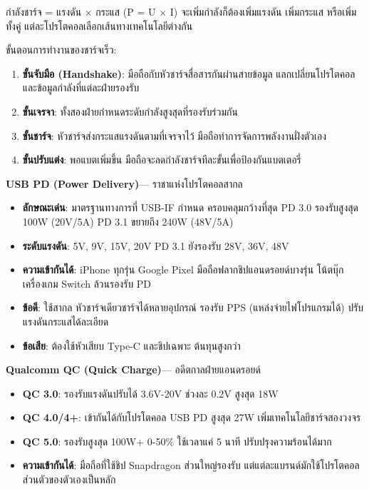 
กำลังชาร์จ = แรงดัน × กระแส (P = U × I) จะเพิ่มกำลังก็ต้องเพิ่มแรงดัน เพิ่มกระแส หรือเพิ่มทั้งคู่ แต่ละโปรโตคอลเลือกเส้นทางเทคโนโลยีต่างกัน

ขั้นตอนการทำงานของชาร์จเร็ว:

\begin{enumerate}
  \item \textbf{ขั้นจับมือ (Handshake)}: มือถือกับหัวชาร์จสื่อสารกันผ่านสายข้อมูล แลกเปลี่ยนโปรโตคอลและข้อมูลกำลังที่แต่ละฝ่ายรองรับ
  \item \textbf{ขั้นเจรจา}: ทั้งสองฝ่ายกำหนดระดับกำลังสูงสุดที่รองรับร่วมกัน
  \item \textbf{ขั้นชาร์จ}: หัวชาร์จส่งกระแสแรงดันตามที่เจรจาไว้ มือถือทำการจัดการพลังงานฝั่งตัวเอง
  \item \textbf{ขั้นปรับแต่ง}: พอแบตเพิ่มขึ้น มือถือจะลดกำลังชาร์จทีละขั้นเพื่อป้องกันแบตเตอรี่
\end{enumerate}


\textbf{USB PD (Power Delivery)}— ราชาแห่งโปรโตคอลสากล

\begin{itemize}
  \item \textbf{ลักษณะเด่น}: มาตรฐานทางการที่ USB-IF กำหนด ครอบคลุมกว้างที่สุด PD 3.0 รองรับสูงสุด 100W (20V/5A) PD 3.1 ขยายถึง 240W (48V/5A)
  \item \textbf{ระดับแรงดัน}: 5V, 9V, 15V, 20V PD 3.1 ยังรองรับ 28V, 36V, 48V
  \item \textbf{ความเข้ากันได้}: iPhone ทุกรุ่น Google Pixel มือถือฟลากชิปแอนดรอยด์บางรุ่น โน้ตบุ๊ก เครื่องเกม Switch ล้วนรองรับ PD
  \item \textbf{ข้อดี}: ใช้สากล หัวชาร์จเดียวชาร์จได้หลายอุปกรณ์ รองรับ PPS (แหล่งจ่ายไฟโปรแกรมได้) ปรับแรงดันกระแสได้ละเอียด
  \item \textbf{ข้อเสีย}: ต้องใช้หัวเสียบ Type-C และชิปเฉพาะ ต้นทุนสูงกว่า
\end{itemize}

\textbf{Qualcomm QC (Quick Charge)}— อดีตกาลฝ่ายแอนดรอยด์

\begin{itemize}
  \item \textbf{QC 3.0}: รองรับแรงดันปรับได้ 3.6V-20V ช่วงละ 0.2V สูงสุด 18W
  \item \textbf{QC 4.0/4+}: เข้ากันได้กับโปรโตคอล USB PD สูงสุด 27W เพิ่มเทคโนโลยีชาร์จสองวงจร
  \item \textbf{QC 5.0}: รองรับสูงสุด 100W+ 0-50\% ใช้เวลาแค่ 5 นาที ปรับปรุงความร้อนได้มาก
  \item \textbf{ความเข้ากันได้}: มือถือที่ใช้ชิป Snapdragon ส่วนใหญ่รองรับ แต่แต่ละแบรนด์มักใช้โปรโตคอลส่วนตัวของตัวเองเป็นหลัก
\end{itemize}

